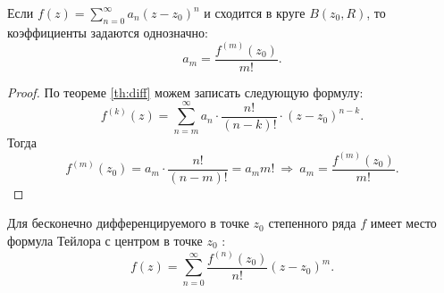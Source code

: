 \begin{thm}
	Если $ f(z) = \sum_{n=0}^{\infty} a_{n}(z-z_0)^{n}$ и сходится в круге $ B(z_0, R)$, то коэффициенты задаются однозначно:
	\[
		a_{m} = \frac{f^{(m)} (z_0) }{m!}
	.\] 
\end{thm}
\begin{proof}
	По теореме \ref{th:diff} можем записать следующую формулу:
	\[
		f^{(k)}(z)  = \sum_{n=m}^{\infty} a_{n}\cdot  \frac{n!}{(n-k)!} \cdot (z-z_0)^{n-k}
	.\] 
	Тогда \[
		f^{(m)}(z_0) = a_{m} \cdot \frac{n!}{(n-m)!} = a_m m! ~ \Longrightarrow ~  a_m = \frac{f^{(m)}(z_0)}{m!}
	.\] 
\end{proof}
\begin{defn}
    Для бесконечно дифференцируемого в точке $ z_0$ степенного ряда $ f$ имеет место формула Тейлора с центром в точке $ z_0$ :
\[
	f(z) = \sum_{n=0}^{\infty} \frac{f^{(n)}(z_0)}{n!} (z - z_0)^{m}
.\] 
\end{defn}

		\fontAwesomeSymbol{\faTaxi}


